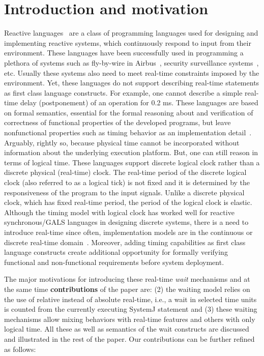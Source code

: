 \section{Introduction and motivation}
\label{sec:intr-motiv}

Reactive languages~\cite{gber931,amal10} are a class of programming
languages used for designing and implementing reactive systems, which
continuously respond to input from their environment. These languages
have been successfully used in programming a plethora of systems such as
fly-by-wire in Airbus~\cite{eairbus}, security surveillance
systems~\cite{amal121}, etc. Usually these systems also need to meet
real-time constraints imposed by the environment. Yet, these languages
do not support describing real-time statements as first class language
constructs.  For example, one cannot describe a simple real-time delay
(postponement) of an operation for 0.2 ms. These languages are based on
formal semantics, essential for the formal reasoning about  and verification of correctness of functional properties of
the developed programs, but leave nonfunctional properties such as
timing behavior as an implementation detail~\cite{boldt07}. Arguably,
rightly so, because physical time cannot be incorporated without
information about the underlying execution platform.  But, one can still
reason in terms of logical time. These languages support discrete
logical clock rather than a discrete physical (real-time) clock. The
real-time period of the discrete logical clock (also referred to as a
logical tick) is not fixed and it is determined by the responsiveness of
the program to the input signals. Unlike a discrete physical clock,
which has fixed real-time period, the period of the logical clock is
elastic. Although the timing model with logical clock has worked well
for reactive synchronous/GALS languages in designing discrete systems,
there is a need to introduce real-time since often, implementation
models are in the continuous or discrete real-time
domain~\cite{DBLP:journals/pieee/SifakisTY03}.  Moreover, adding timing
capabilities as first class language constructs create additional
opportunity for formally verifying functional and non-functional
requirements before system deployment.



The major motivations for introducing these real-time \textit{wait}
mechanisms and at the same time \textbf{contributions} of the paper are:
 (2) the
	waiting model relies on the use of relative instead of absolute
	real-time, i.e., a wait in selected time units is counted from the
	currently executing SystemJ statement and (3) these waiting mechanisms
	allow mixing behaviors with real-time features and others with only
	logical time. All these as well as semantics of the wait constructs
	are discussed and illustrated in the rest of the paper. Our
	contributions can be further refined as follows:

